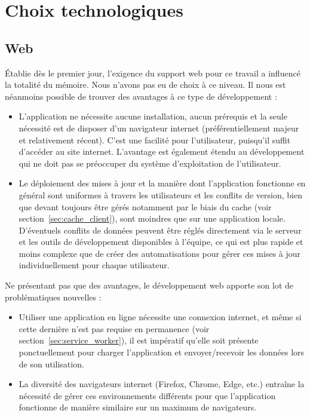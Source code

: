 \documentclass{EPL-master-thesis-covers-FR}
\begin{document}

		\section{Choix technologiques}
			\label{sec:choix_tech}



			\subsection*{Web}

				\'Etablie dès le premier jour, l'exigence du support web pour ce travail a influencé la totalité du mémoire. Nous n'avons pas eu de choix à ce niveau. Il nous est néanmoins possible de trouver des avantages à ce type de développement :
				\begin{itemize}
					\item L'application ne nécessite aucune installation, aucun prérequis et la seule nécessité est de disposer d'un navigateur internet (préférentiellement majeur et relativement récent). C'est une facilité pour l'utilisateur, puisqu'il suffit d'accéder au site internet. L'avantage est également étendu au développement qui ne doit pas se préoccuper du système d'exploitation de l'utilisateur.
					\item Le déploiement des mises à jour et la manière dont l'application fonctionne en général sont uniformes à travers les utilisateurs et les conflits de version, bien que devant toujours être gérés notamment par le biais du cache (voir section~\ref{sec:cache_client}), sont moindres que sur une application locale. D'éventuels conflits de données peuvent être réglés directement via le serveur et les outils de développement disponibles à l'équipe, ce qui est plus rapide et moins complexe que de créer des automatisations pour gérer ces mises à jour individuellement pour chaque utilisateur.
				\end{itemize}

				Ne présentant pas que des avantages, le développement web apporte son lot de problématiques nouvelles :
				\begin{itemize}
					\item Utiliser une application en ligne nécessite une connexion internet, et même si cette dernière n'est pas requise en permanence (voir section~\ref{sec:service_worker}), il est impératif qu'elle soit présente ponctuellement pour charger l'application et envoyer/recevoir les données lors de son utilisation.
					\item La diversité des navigateurs internet (Firefox, Chrome, Edge, etc.) entraîne la nécessité de gérer ces environnements différents pour que l'application fonctionne de manière similaire sur un maximum de navigateurs.
				\end{itemize}
\end{document}
